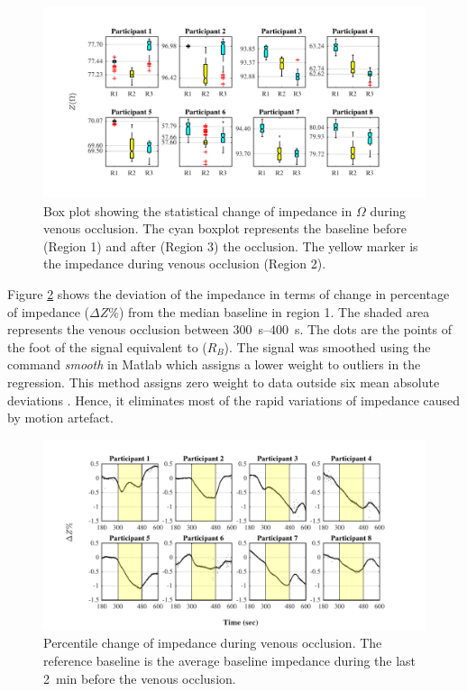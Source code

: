 \begin{figure}[htbp]
	\centering
	\includegraphics[width=15cm,keepaspectratio]{figure_vop_1}    
	\caption[Change of impedance during venous occlusion]{Box plot showing the statistical change of impedance in $\Omega$ during venous occlusion. The cyan boxplot represents the baseline before (Region 1) and after (Region 3) the occlusion. The yellow marker is the impedance during venous occlusion (Region 2).}
	\label{fig:venous statistics impedance}
\end{figure}  
 
Figure \ref{fig:venous occlusion impedance} shows the deviation of the impedance in terms of change in percentage of impedance ($\Delta Z\%$) from the median baseline in region 1. The shaded area represents the venous occlusion between \SIrange{300}{400}{\second}. The dots are the points of the foot of the signal equivalent to ($R_B$). The signal was smoothed using the command \textit{smooth} in Matlab which assigns a lower weight to outliers in the regression. This method assigns zero weight to data outside six mean absolute deviations \cite{MATLAB:2016}. Hence, it eliminates most of the rapid variations of impedance caused by motion artefact. 

\begin{figure}[htbp]
	\centering
	\includegraphics[width=15cm,keepaspectratio]{figure_vop_2}    
	\caption[Percentile variation of impedance during venous occlusion]{Percentile change of impedance during venous occlusion. The reference baseline is the average baseline impedance during the last \SI{2}{\minute} before the venous occlusion.}
	\label{fig:venous occlusion impedance}
\end{figure} 

